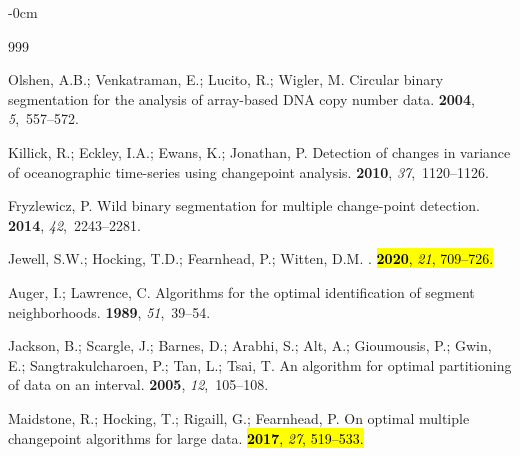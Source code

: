 \documentclass[algorithms,article,accept,oneauthor]{Definitions/mdpi}
\begin{document}
\begin{adjustwidth}{-\extralength}{0cm}

\begin{thebibliography}{999}

Olshen, A.B.; Venkatraman, E.; Lucito, R.; Wigler, M.
\newblock Circular binary segmentation for the analysis of array-based DNA copy
  number data.
 {\bf 2004}, {\em 5},~557--572.

Killick, R.; Eckley, I.A.; Ewans, K.; Jonathan, P.
\newblock Detection of changes in variance of oceanographic time-series using
  changepoint analysis.
 {\bf 2010}, {\em 37},~1120--1126.

Fryzlewicz, P.
\newblock Wild binary segmentation for multiple change-point detection.
 {\bf 2014}, {\em 42},~2243--2281.

Jewell, S.W.; Hocking, T.D.; Fearnhead, P.; Witten, D.M.
.
 \hl{{\bf 2020}, \textit{21}, 709--726.} %


Auger, I.; Lawrence, C.
\newblock Algorithms for the optimal identification of segment neighborhoods.
 {\bf 1989}, {\em 51},~39--54.

Jackson, B.; Scargle, J.; Barnes, D.; Arabhi, S.; Alt, A.; Gioumousis, P.;
  Gwin, E.; Sangtrakulcharoen, P.; Tan, L.; Tsai, T.
\newblock An algorithm for optimal partitioning of data on an interval.
 {\bf 2005}, {\em 12},~105--108.

Maidstone, R.; Hocking, T.; Rigaill, G.; Fearnhead, P.
\newblock On optimal multiple changepoint algorithms for large data.
  \hl{\textbf{2017}, \textit{27}, 519--533.} %



\end{thebibliography}
\end{adjustwidth}
\end{document}
